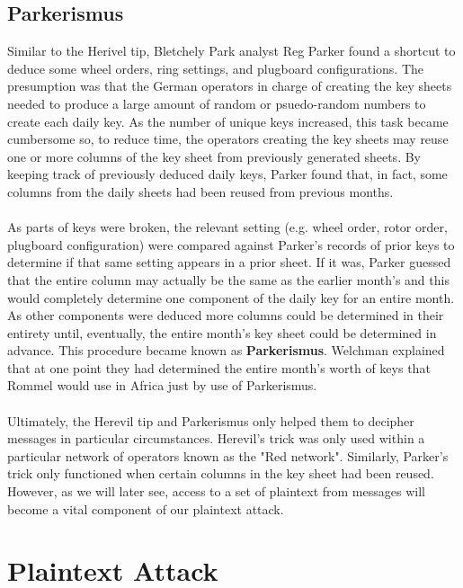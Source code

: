 \subsection{Parkerismus}
Similar to the Herivel tip, Bletchely Park analyst Reg Parker found a
shortcut to deduce some wheel orders, ring settings, and plugboard
configurations. The presumption was that the German operators in
charge of creating the key sheets needed to produce a large amount of
random or psuedo-random numbers to create each daily key. As the
number of unique keys increased, this task became cumbersome so, to
reduce time, the operators creating the key sheets may reuse one or
more columns of the key sheet from previously generated sheets. By
keeping track of previously deduced daily keys, Parker found that, in
fact, some columns from the daily sheets had been reused from
previous months. 
\\\\As parts of keys were broken, the relevant setting
(e.g. wheel order, rotor order, plugboard configuration) were compared
against Parker's records of prior keys to determine if that same
setting appears in a prior sheet. If it was, Parker guessed that the
entire column may actually be the same as the earlier month's and
this would completely determine one component of the daily key for an
entire month. As other components were deduced more columns could be
determined in their entirety until, eventually, the entire month's
key sheet could be determined in advance. This procedure became known
as {\bf{Parkerismus}}. Welchman explained that at one point they had
determined the entire month's worth of keys that Rommel would use in
Africa just by use of Parkerismus.
\\\\Ultimately, the Herevil tip and Parkerismus only helped them to
decipher messages in particular circumstances. Herevil's trick was only used within a
particular network of operators known as the "Red network". Similarly,
Parker's trick only functioned when certain columns in the key sheet
had been reused. However,
as we will later see, access to a set of plaintext from messages will
become a vital component of our plaintext attack.

\section{Plaintext Attack}

